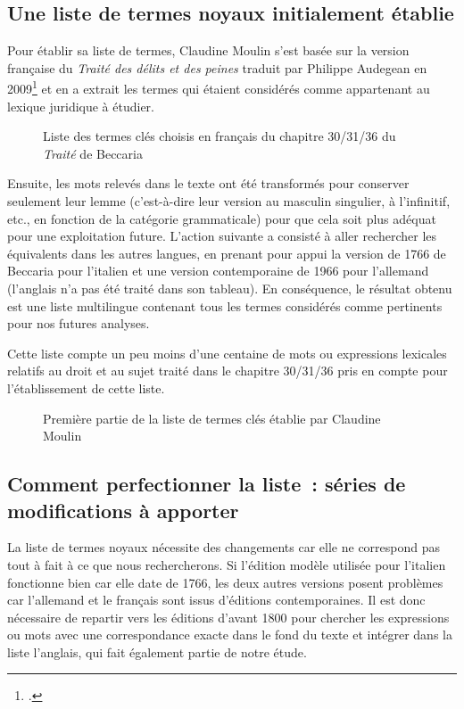 \subsection{Une liste de termes noyaux initialement établie}
Pour établir sa liste de termes, Claudine Moulin s'est basée sur la version française du \emph{Traité des délits et des peines} traduit par Philippe Audegean en 2009\footcite{beccaria_audegean_2009} et en a extrait les termes qui étaient considérés comme appartenant au lexique juridique à étudier. 
\begin{figure}[H]
    \centering
    \caption{Liste des termes clés choisis en français du chapitre 30/31/36 du \emph{Traité} de Beccaria}
    \label{fig:termes_cles1}
\end{figure}
Ensuite, les mots relevés dans le texte ont été transformés pour conserver seulement leur lemme (c'est-à-dire leur version au masculin singulier, à l'infinitif, etc., en fonction de la catégorie grammaticale) pour que cela soit plus adéquat pour une exploitation future. L'action suivante a consisté à aller rechercher les équivalents dans les autres langues, en prenant pour appui la version de 1766 de Beccaria pour l'italien et une version contemporaine de 1966 pour l'allemand (l'anglais n'a pas été traité dans son tableau). En conséquence, le résultat obtenu est une liste multilingue contenant tous les termes considérés comme pertinents pour nos futures analyses.

Cette liste compte un peu moins d'une centaine de mots ou expressions lexicales relatifs au droit et au sujet traité dans le chapitre 30/31/36 pris en compte pour l'établissement de cette liste.
\begin{figure}[H]
    \centering
    \caption{Première partie de la liste de termes clés établie par Claudine Moulin}
    \label{fig:termes_cles2}
\end{figure}

\subsection{Comment perfectionner la liste~: séries de modifications à apporter}
La liste de termes noyaux nécessite des changements car elle ne correspond pas tout à fait à ce que nous rechercherons. Si l'édition modèle utilisée pour l'italien fonctionne bien car elle date de 1766, les deux autres versions posent problèmes car l'allemand et le français sont issus d'éditions contemporaines. Il est donc nécessaire de repartir vers les éditions d'avant 1800 pour chercher les expressions ou mots avec une correspondance exacte dans le fond du texte et intégrer dans la liste l'anglais, qui fait également partie de notre étude.


